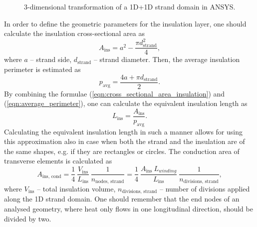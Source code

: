 \begin{figure}[H]
    \caption{3-dimensional transformation of a 1D+1D strand domain in ANSYS.}
    \label{fig: 1d_strand_geometry_with_insulation}
\end{figure}

In order to define the geometric parameters for the insulation layer, one should calculate the insulation cross-sectional area as
\begin{equation}
    A_\text{ins} = a^2 - \frac{\pi d_\text{strand}^2}{4}, 
    \label{eqn:cross_sectional_area_insulation}
\end{equation}
where $a$ -- strand side, $d_\text{strand}$ -- strand diameter. Then, the average insulation perimeter is estimated as
\begin{equation}
    p_\text{avg} = \frac{4 a + \pi d_\text{strand}}{2}.
    \label{eqn:average_perimeter}
\end{equation}
By combining the formulae (\ref{eqn:cross_sectional_area_insulation}) and (\ref{eqn:average_perimeter}), one can calculate the equivalent insulation length as 
\begin{equation}
    L_\text{ins} = \frac{A_\text{ins}}{p_\text{avg}}.
    \label{eqn:equivalent_insulation_length}
\end{equation}
Calculating the equivalent insulation length in such a manner allows for using this approximation also in case when both the strand and the insulation are of the same shapes, e.g. if they are rectangles or circles. The conduction area of transverse elements is calculated as
\begin{equation}
    A_\text{ins, cond} = \frac{1}{4}~\frac{ V_\text{ins}}{L_\text{ins}}~\frac{1}{n_\text{nodes, strand}}= \frac{1}{4}~\frac{ A_\text{ins} ~ L_{winding}}{L_\text{ins}}~\frac{1}{n_\text{divisions, strand}},
    \label{eqn:equivalent_insulation_element_area}
\end{equation}
where $V_\text{ins}$ -- total insulation volume, $n_\text{divisions, strand}$ -- number of divisions applied along the 1D strand domain. One should remember that the end nodes of an analysed geometry, where heat only flows in one longitudinal direction, should be divided by two.

